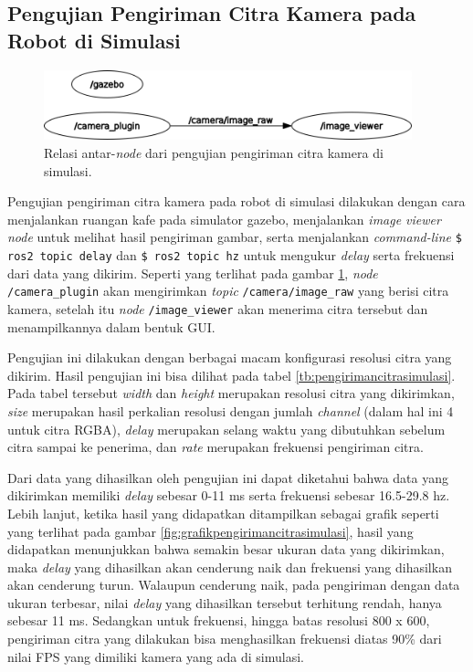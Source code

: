 \subsection{Pengujian Pengiriman Citra Kamera pada Robot di Simulasi}
\label{subsec:citrasimulasi}

\begin{figure}[ht]
  \centering
  \includegraphics[width=0.95\textwidth,keepaspectratio]{gambar/rosgraph-camera-plugin.png}
  \caption{Relasi antar-\emph{node} dari pengujian pengiriman citra kamera di simulasi.}
  \label{fig:rosgraphcameraplugin}
\end{figure}

Pengujian pengiriman citra kamera pada robot di simulasi dilakukan dengan cara menjalankan ruangan kafe pada simulator gazebo,
  menjalankan \emph{image viewer node} untuk melihat hasil pengiriman gambar,
  serta menjalankan \emph{command-line} \lstinline{$ ros2 topic delay} dan \lstinline{$ ros2 topic hz} untuk mengukur \emph{delay} serta frekuensi dari data yang dikirim.
Seperti yang terlihat pada gambar \ref{fig:rosgraphcameraplugin},
  \emph{node} \lstinline{/camera_plugin} akan mengirimkan \emph{topic} \lstinline{/camera/image_raw} yang berisi citra kamera,
  setelah itu \emph{node} \lstinline{/image_viewer} akan menerima citra tersebut dan menampilkannya dalam bentuk GUI.



Pengujian ini dilakukan dengan berbagai macam konfigurasi resolusi citra yang dikirim.
Hasil pengujian ini bisa dilihat pada tabel \ref{tb:pengirimancitrasimulasi}.
Pada tabel tersebut \emph{width} dan \emph{height} merupakan resolusi citra yang dikirimkan,
  \emph{size} merupakan hasil perkalian resolusi dengan jumlah \emph{channel} (dalam hal ini 4 untuk citra RGBA),
  \emph{delay} merupakan selang waktu yang dibutuhkan sebelum citra sampai ke penerima,
  dan \emph{rate} merupakan frekuensi pengiriman citra.

Dari data yang dihasilkan oleh pengujian ini dapat diketahui bahwa data yang dikirimkan memiliki \emph{delay} sebesar 0-11 ms serta frekuensi sebesar 16.5-29.8 hz.
Lebih lanjut, ketika hasil yang didapatkan ditampilkan sebagai grafik seperti yang terlihat pada gambar \ref{fig:grafikpengirimancitrasimulasi},
  hasil yang didapatkan menunjukkan bahwa semakin besar ukuran data yang dikirimkan,
  maka \emph{delay} yang dihasilkan akan cenderung naik dan frekuensi yang dihasilkan akan cenderung turun.
Walaupun cenderung naik, pada pengiriman dengan data ukuran terbesar,
  nilai \emph{delay} yang dihasilkan tersebut terhitung rendah, hanya sebesar 11 ms.
Sedangkan untuk frekuensi,
  hingga batas resolusi 800 x 600,
  pengiriman citra yang dilakukan bisa menghasilkan frekuensi diatas 90\% dari nilai FPS yang dimiliki kamera yang ada di simulasi.


